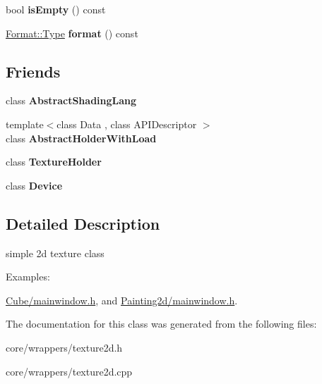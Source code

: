 \begin{DoxyCompactItemize}
\item 
\hypertarget{class_tempest_1_1_texture2d_a0ba81fabf87be69d86f92b02f4337a54}{bool {\bfseries is\+Empty} () const }\label{class_tempest_1_1_texture2d_a0ba81fabf87be69d86f92b02f4337a54}

\item 
\hypertarget{class_tempest_1_1_texture2d_a0fb65318562c6e9d3bb7971a82f9df7e}{\hyperlink{struct_tempest_1_1_abstract_texture_1_1_format_a231a1f516e53783bf72c713669b115b3}{Format\+::\+Type} {\bfseries format} () const }\label{class_tempest_1_1_texture2d_a0fb65318562c6e9d3bb7971a82f9df7e}

\end{DoxyCompactItemize}
\subsection*{Friends}
\begin{DoxyCompactItemize}
\item 
\hypertarget{class_tempest_1_1_texture2d_aae7a40a130def4c19f2b818dc9c51de2}{class {\bfseries Abstract\+Shading\+Lang}}\label{class_tempest_1_1_texture2d_aae7a40a130def4c19f2b818dc9c51de2}

\item 
\hypertarget{class_tempest_1_1_texture2d_ad2e2e5798093053ccfa5c8bebc2e621f}{{\footnotesize template$<$class Data , class A\+P\+I\+Descriptor $>$ }\\class {\bfseries Abstract\+Holder\+With\+Load}}\label{class_tempest_1_1_texture2d_ad2e2e5798093053ccfa5c8bebc2e621f}

\item 
\hypertarget{class_tempest_1_1_texture2d_a8bcfee155fddaa3e9e41bfa1fed743c3}{class {\bfseries Texture\+Holder}}\label{class_tempest_1_1_texture2d_a8bcfee155fddaa3e9e41bfa1fed743c3}

\item 
\hypertarget{class_tempest_1_1_texture2d_a520fa05e0bf58785da428f7a0241eee2}{class {\bfseries Device}}\label{class_tempest_1_1_texture2d_a520fa05e0bf58785da428f7a0241eee2}

\end{DoxyCompactItemize}


\subsection{Detailed Description}
simple 2d texture class \begin{Desc}
\item[Examples\+: ]\par
\hyperlink{_cube_2mainwindow_8h-example}{Cube/mainwindow.\+h}, and \hyperlink{_painting2d_2mainwindow_8h-example}{Painting2d/mainwindow.\+h}.\end{Desc}


The documentation for this class was generated from the following files\+:\begin{DoxyCompactItemize}
\item 
core/wrappers/texture2d.\+h\item 
core/wrappers/texture2d.\+cpp\end{DoxyCompactItemize}

